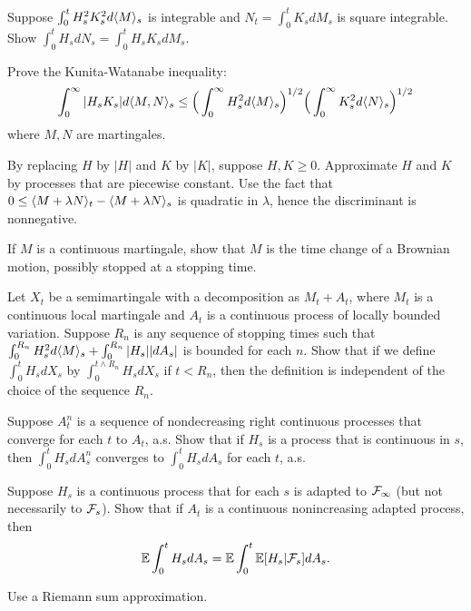 \begin{exercise}\label{ex:ch1_23}
Suppose $\int_0^t H_s^2 K_s^2 d\langle M \rangle_s$ is integrable and $N_t = \int_0^t K_s dM_s$ is square integrable. Show $\int_0^t H_s dN_s = \int_0^t H_s K_s dM_s$.
\end{exercise}

\begin{exercise}\label{ex:ch1_24}
Prove the Kunita-Watanabe inequality:
\[
    \int_0^\infty |H_s K_s| d\langle M,N \rangle_s \leq \Big(\int_0^\infty H_s^2 d\langle M \rangle_s\Big)^{1/2} \Big(\int_0^\infty K_s^2 d\langle N \rangle_s\Big)^{1/2}
\]
where $M,N$ are martingales.

\hint By replacing $H$ by $|H|$ and $K$ by $|K|$, suppose $H,K \geq 0$. Approximate $H$ and $K$ by processes that are piecewise constant. Use the fact that $0 \leq \langle M + \lambda N \rangle_t - \langle M + \lambda N \rangle_s$ is quadratic in $\lambda$, hence the discriminant is nonnegative.
\end{exercise}

\begin{exercise}\label{ex:ch1_25}
If $M$ is a continuous martingale, show that $M$ is the time change of a Brownian motion, possibly stopped at a stopping time.
\end{exercise}

\begin{exercise}\label{ex:ch1_26}
Let $X_t$ be a semimartingale with a decomposition as $M_t + A_t$, where $M_t$ is a continuous local martingale and $A_t$ is a continuous process of locally bounded variation. Suppose $R_n$ is any sequence of stopping times such that $\int_0^{R_n} H_s^2 d\langle M \rangle_s + \int_0^{R_n} |H_s||dA_s|$ is bounded for each $n$. Show that if we define $\int_0^t H_s dX_s$ by $\int_0^{t\wedge R_n} H_s dX_s$ if $t < R_n$, then the definition is independent of the choice of the sequence $R_n$.
\end{exercise}

\begin{exercise}\label{ex:ch1_27}
Suppose $A_t^n$ is a sequence of nondecreasing right continuous processes that converge for each $t$ to $A_t$, a.s. Show that if $H_s$ is a process that is continuous in $s$, then $\int_0^t H_s dA_s^n$ converges to $\int_0^t H_s dA_s$ for each $t$, a.s.
\end{exercise}

\begin{exercise}\label{ex:ch1_28}
Suppose $H_s$ is a continuous process that for each $s$ is adapted to $\mathcal{F}_\infty$ (but not necessarily to $\mathcal{F}_s$). Show that if $A_t$ is a continuous nonincreasing adapted process, then
\[
    \mathbb{E} \int_0^t H_s dA_s = \mathbb{E} \int_0^t \mathbb{E}[H_s| \mathcal{F}_s] dA_s.
\]

\hint Use a Riemann sum approximation.
\end{exercise}

